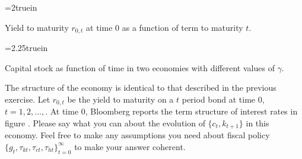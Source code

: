 \medskip
{}
\centerline{\epsfxsize=2truein}
\caption{Yield to maturity $r_{0,t}$ at time $0$ as a function of term to maturity $t$.}
\endfigure
\medskip
%
%
\centerline{\epsfxsize=2.25truein}
\caption{Capital stock as function of time in two economies with different values of $\gamma$.}
\endfigure
\medskip
{}
\medskip
\noindent
The structure of the  economy is identical to that described in the previous exercise.
Let $r_{0,t}$ be the yield to maturity on a $t$ period bond at time $0$, $t=1, 2, \ldots, $.  At time $0$, Bloomberg reports the term structure of interest rates
in figure . Please say what you can about the evolution of $\{c_t, k_{t+1}\}$ in this economy.  Feel free to make any assumptions you need  about fiscal policy
$\{g_t, \tau_{kt}, \tau_{ct}, \tau_{ht}\}_{t=0}^\infty$ to make your answer coherent.


